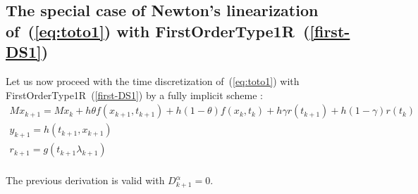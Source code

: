 \subsection{The special case of Newton's linearization of~(\ref{eq:toto1}) with FirstOrderType1R~(\ref{first-DS1})} 


Let us now proceed with the time discretization of~(\ref{eq:toto1}) with FirstOrderType1R~(\ref{first-DS1})  by a fully implicit scheme : 
\begin{equation}
  \begin{array}{l}
    \label{eq:mlcp3-toto1-DS1}
     M x_{k+1} = M x_{k} +h\theta f(x_{k+1},t_{k+1})+h(1-\theta) f(x_k,t_k) + h \gamma r(t_{k+1})
     + h(1-\gamma)r(t_k)  \\[2mm]
     y_{k+1} =  h(t_{k+1},x_{k+1}) \\[2mm]
     r_{k+1} = g(t_{k+1}\lambda_{k+1})\\[2mm]
  \end{array}
\end{equation}

The previous derivation is valid with $ D^{\alpha}_{k+1} =0$.



